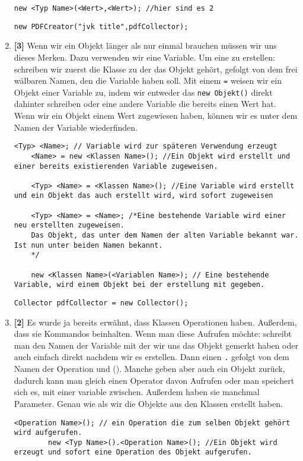 \begin{enumerate}
\begin{lstlisting}[title=\textbf{Konstruktor Syntax},firstnumber=5]
    new <Typ Name>(<Wert>,<Wert>); //hier sind es 2
    \end{lstlisting}
          \begin{lstlisting}[title=\textbf{Beispiel (1/3) Konstruktor},firstnumber=2,frame=lr]
        new PDFCreator("jvk title",pdfCollector);
    \end{lstlisting}
    \item \textbf{[3]} Wenn wir ein Objekt länger als nur einmal brauchen müssen wir uns dieses Merken. Dazu verwenden wir eine Variable. Um eine zu erstellen: schreiben wir zuerst die Klasse zu der das Objekt gehört, gefolgt von dem frei wälbaren Namen, den die Variable haben soll. Mit einem \lstinline{=} weisen wir ein Objekt einer Variable zu, indem wir entweder das \lstinline{new Objekt()} direkt dahinter schreiben oder eine andere
          Variable die bereits einen Wert hat.
          Wenn wir ein Objekt einem Wert zugewiesen haben, können wir es unter dem Namen der Variable wiederfinden.
          \begin{lstlisting}[title=\textbf{Variablen Syntax}]
    <Typ> <Name>; // Variable wird zur späteren Verwendung erzeugt
    <Name> = new <Klassen Name>(); //Ein Objekt wird erstellt und einer bereits existierenden Variable zugeweisen.

    <Typ> <Name> = <Klassen Name>(); //Eine Variable wird erstellt und ein Objekt das auch erstellt wird, wird sofort zugeweisen

    <Typ> <Name> = <Name>; /*Eine bestehende Variable wird einer neu erstellten zugeweisen.
    Das Objekt, das unter dem Namen der alten Variable bekannt war. Ist nun unter beiden Namen bekannt.
    */

    new <Klassen Name>(<Variablen Name>); // Eine bestehende Variable, wird einem Objekt bei der erstellung mit gegeben.
          \end{lstlisting}
          \begin{lstlisting}[title=\textbf{Beispiel (2/3) Variablen},firstnumber=1,frame=ltr]
            Collector pdfCollector = new Collector();
        \end{lstlisting}
    \item \textbf{[2]} Es wurde ja bereits erwähnt, dass Klassen Operationen haben. Außerdem, dass sie  Kommandos beinhalten. Wenn man diese Aufrufen möchte: schreibt man den Namen der Variable mit der wir uns das Objekt gemerkt haben oder auch einfach direkt nachdem wir es erstellen. Dann einen \lstinline{.} gefolgt von dem Namen der Operation und (). Manche geben aber auch ein Objekt zurück, dadurch kann man gleich einen Operator davon Aufrufen oder man speichert sich es, mit einer variable zwischen. Außerdem haben sie manchmal Parameter. Genau wie als wir die Objekte aus den Klassen erstellt haben.
          \begin{lstlisting}[title=\textbf{Kommando Syntax},firstnumber=4]
        <Operation Name>(); // ein Operation die zum selben Objekt gehört wird aufgerufen.
        new <Typ Name>().<Operation Name>(); //Ein Objekt wird erzeugt und sofort eine Operation des Objekt aufgerufen.


\end{lstlisting}
\end{enumerate}
